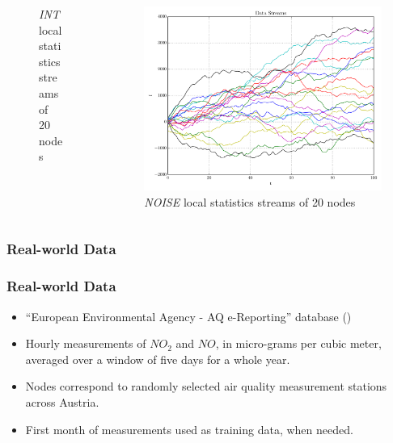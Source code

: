\documentclass[hyperref={pdfpagelabels=false}]{beamer}
\begin{document}
\begin{frame}
\begin{columns}
\begin{column}[t]{0.32\linewidth}
\begin{figure}
\caption{\emph{INT} local statistics streams of 20 nodes} 
\end{figure}
\end{column}
\begin{column}[t]{0.32\linewidth}
\begin{figure}
\vspace{-1cm}
\centering
\includegraphics[scale=0.16]{../img/noisyinterweaving1D20N_streams.pdf}
\caption{\emph{NOISE} local statistics streams of 20 nodes} 
\end{figure}
\end{column}
\end{columns}
\end{frame}

\subsubsection*{Real-world Data}
\begin{frame} \frametitle{Real-world Data}
\begin{itemize}
\item ``European Environmental Agency - AQ e-Reporting'' database {\tiny()}
\item Hourly measurements of $NO_2$ and $NO$, in micro-grams per cubic meter, averaged over a window of five days for a whole year.
\item Nodes correspond to randomly selected air quality measurement stations across Austria.
\item First month of measurements used as training data, when needed.
\end{itemize}
\end{frame}
\end{document}

